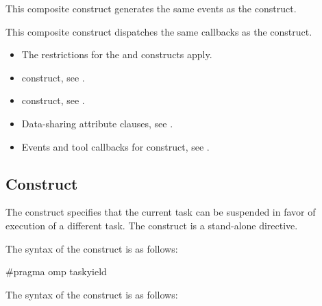 \events

This composite construct generates the same events as the  construct.

\tools

This composite construct dispatches the same callbacks as the  construct.

\restrictions
\begin{itemize}
\item The restrictions for the  and  constructs apply.
\end{itemize}

\crossreferences
\begin{itemize}
\item {} construct, see .
\item {} construct, see .
\item Data-sharing attribute clauses, see .
\item Events and tool callbacks for  construct, see
.

\end{itemize}



%
%
\subsection{ Construct}
\label{subsec:taskyield Construct}
\summary
The  construct specifies that the current task can be suspended in favor of
execution of a different task. The  construct is a stand-alone directive.

\syntax
\begin{ccppspecific}
The syntax of the  construct is as follows:

\begin{ompcPragma}
#pragma omp taskyield 
\end{ompcPragma}
\end{ccppspecific}

\begin{fortranspecific}
The syntax of the  construct is as follows:

\end{fortranspecific}

